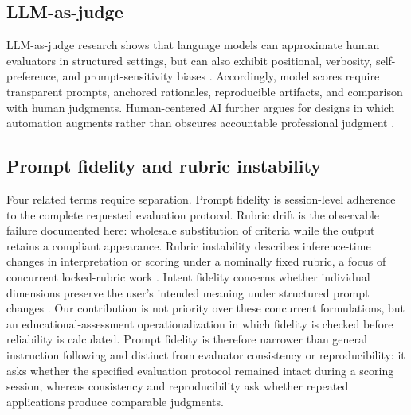 \documentclass[sigconf]{acmart}
\begin{document}
\subsection{LLM-as-judge}
LLM-as-judge research shows that language models can approximate human evaluators in structured settings, but can also exhibit positional, verbosity, self-preference, and prompt-sensitivity biases \cite{liu2023geval,thakur2025judging,zheng2023judging}. Accordingly, model scores require transparent prompts, anchored rationales, reproducible artifacts, and comparison with human judgments. Human-centered AI further argues for designs in which automation augments rather than obscures accountable professional judgment \cite{shneiderman2022human}.

\subsection{Prompt fidelity and rubric instability}
Four related terms require separation. Prompt fidelity is session-level adherence to the complete requested evaluation protocol. Rubric drift is the observable failure documented here: wholesale substitution of criteria while the output retains a compliant appearance. Rubric instability describes inference-time changes in interpretation or scoring under a nominally fixed rubric, a focus of concurrent locked-rubric work \cite{hong2026rubrics}. Intent fidelity concerns whether individual dimensions preserve the user's intended meaning under structured prompt changes \cite{peng2026dimension}. Our contribution is not priority over these concurrent formulations, but an educational-assessment operationalization in which fidelity is checked before reliability is calculated. Prompt fidelity is therefore narrower than general instruction following and distinct from evaluator consistency or reproducibility: it asks whether the specified evaluation protocol remained intact during a scoring session, whereas consistency and reproducibility ask whether repeated applications produce comparable judgments.
\end{document}

